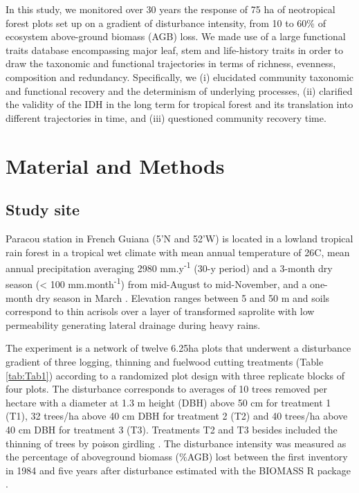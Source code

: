 \documentclass[fleqn,10pt]{ArtEcoFoG} %
\begin{document}
In this study, we monitored over 30 years the response of 75 ha of
neotropical forest plots set up on a gradient of disturbance intensity,
from 10 to 60\% of ecosystem above-ground biomass (AGB) loss. We made
use of a large functional traits database encompassing major leaf, stem
and life-history traits in order to draw the taxonomic and functional
trajectories in terms of richness, evenness, composition and redundancy.
Specifically, we (i) elucidated community taxonomic and functional
recovery and the determinism of underlying processes, (ii) clarified the
validity of the IDH in the long term for tropical forest and its
translation into different trajectories in time, and (iii) questioned
community recovery time.

\section{Material and Methods}\label{material-and-methods}

\subsection{Study site}\label{study-site}

Paracou station in French Guiana (5'N and
52'W) is located in a lowland tropical rain forest in a
tropical wet climate with mean annual temperature of 26\textdegree C,
mean annual precipitation averaging 2980 mm.y\textsuperscript{-1} (30-y
period) and a 3-month dry season (\textless{} 100
mm.month\textsuperscript{-1}) from mid-August to mid-November, and a
one-month dry season in March \citep{Wagner2011}. Elevation ranges
between 5 and 50 m and soils correspond to thin acrisols over a layer of
transformed saprolite with low permeability generating lateral drainage
during heavy rains.

The experiment is a network of twelve 6.25ha plots that underwent a
disturbance gradient of three logging, thinning and fuelwood cutting
treatments (Table \ref{tab:Tab1}) according to a randomized plot design
with three replicate blocks of four plots. The disturbance corresponds
to averages of 10 trees removed per hectare with a diameter at 1.3 m
height (DBH) above 50 cm for treatment 1 (T1), 32 trees/ha above 40 cm
DBH for treatment 2 (T2) and 40 trees/ha above 40 cm DBH for treatment 3
(T3). Treatments T2 and T3 besides included the thinning of trees by
poison girdling \citep{Schmitt1990}. The disturbance intensity was
measured as the percentage of aboveground biomass (\%AGB) lost between
the first inventory in 1984 and five years after disturbance
\citep{Piponiot2016} estimated with the BIOMASS R package
\citep{Biomass2018}.
\end{document}
